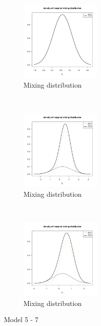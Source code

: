 \documentclass[10pt,a4paper]{article}
\begin{document}
	\begin{figure}[h!]
		\centering
		\begin{subfigure}[t]{0.3\textwidth}
			\centering
			\includegraphics[width=4cm]{results/train_random_time_C1/marginal.pdf}
			\caption{Mixing distribution}
		\end{subfigure}%
		~ 
		\begin{subfigure}[t]{0.3\textwidth}
			\centering
			\includegraphics[width=4cm]{results/train_random_time_C2/marginal.pdf}
			\caption{Mixing distribution}
		\end{subfigure}
		~ 
		\begin{subfigure}[t]{0.3\textwidth}
			\centering
			\includegraphics[width=4cm]{results/train_random_time_Cf/marginal.pdf}
			\caption{Mixing distribution}
		\end{subfigure}
		\caption{Model 5 - 7}
	\end{figure}
\end{document}
